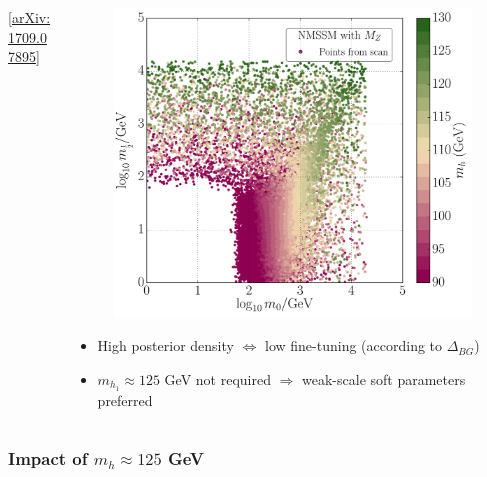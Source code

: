 \documentclass[10pt,aspectratio=169]{beamer}
\begin{document}
\begin{frame}
\begin{columns}[t]
\begin{column}{0.7\textwidth}
      \vspace{-12pt}
      \begin{center}
        \tiny [\href{http://arxiv.org/abs/1709.07895}{arXiv:1709.07895}]
      \end{center}
    \end{column}
    \begin{column}{0.3\textwidth}
      \vspace{-25pt}
      \begin{figure}
        \centering
        \includegraphics[height=0.9\textwidth]{CNMSSM_mh}
      \end{figure}
      \vspace{-10pt}
      \begin{itemize} \itemsep1em
      \item High posterior density $\Leftrightarrow$ low fine-tuning
        (according to $\Delta_{BG}$)
      \item $m_{h_1} \approx 125$ GeV not required $\Rightarrow$
        weak-scale soft parameters preferred
      \end{itemize}
    \end{column}
  \end{columns}
\end{frame}

\begin{frame}
  \frametitle{Impact of $m_h \approx 125$ GeV}
\end{frame}
\end{document}
